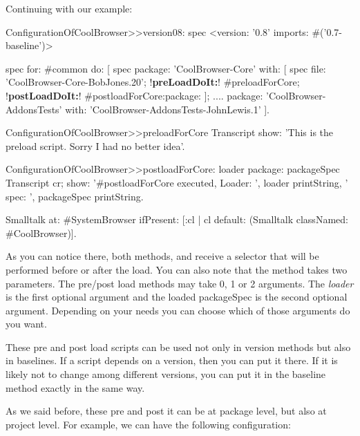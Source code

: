 \documentclass[a4paper,10pt,twoside]{book}
\begin{document}
Continuing with our example:

\begin{code}{}
ConfigurationOfCoolBrowser>>version08: spec 
       <version: '0.8' imports: #('0.7-baseline')>
       
       spec for: #common do: [
              spec 
                     package: 'CoolBrowser-Core' with: [
                            spec 
                                   file: 'CoolBrowser-Core-BobJones.20';
                                   !\textbf{preLoadDoIt:}! #preloadForCore;
                                   !\textbf{postLoadDoIt:}! #postloadForCore:package: ];
                     ....
                     package: 'CoolBrowser-AddonsTests' with: 'CoolBrowser-AddonsTests-JohnLewis.1' ].
\end{code}

\begin{code}{}
ConfigurationOfCoolBrowser>>preloadForCore
         Transcript show: 'This is the preload script. Sorry I had no better idea'. 
\end{code}

\begin{code}{}
ConfigurationOfCoolBrowser>>postloadForCore: loader package: packageSpec
       Transcript cr; 
              show: '#postloadForCore executed, Loader: ', loader printString, 
                     ' spec: ', packageSpec printString.
       
       Smalltalk at: #SystemBrowser ifPresent: [:cl | cl default: (Smalltalk classNamed: #CoolBrowser)].
\end{code}

As you can notice there, both methods,  and  receive a selector that will be performed before or after the load. You can also note that the method   takes two parameters. The pre/post load methods may take 0, 1 or 2 arguments. The {\em loader}  is the first optional argument and the loaded packageSpec is the second optional argument. Depending on your needs you can choose which of those arguments do you want.

These pre and post load scripts can be used not only in version methods but also in baselines. If a script depends on a version, then you can put it there. If it is likely not to change among different versions, you can put it in the baseline method exactly in the same way.

As we said before, these pre and post it can be at package level, but also at project level. For example, we can have the following configuration:
\end{document}
